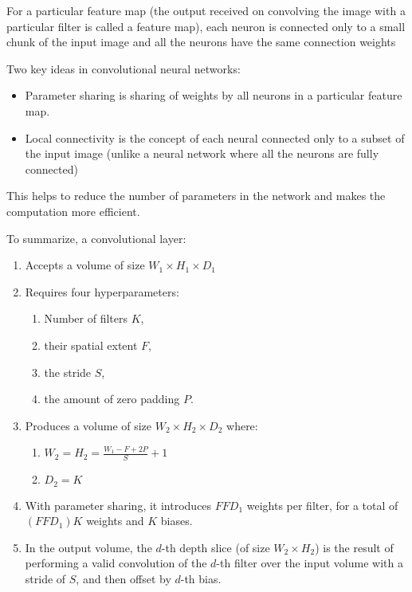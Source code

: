 For a particular feature map (the output received on convolving the image with a particular filter is called a feature map), each neuron is connected only to a small chunk of the input image and all the neurons have the same connection weights

Two key ideas in convolutional neural networks:

\begin{itemize}
    \item Parameter sharing is sharing of weights by all neurons in a particular feature map.
    \item Local connectivity is the concept of each neural connected only to a subset of the input image (unlike a neural network where all the neurons are fully connected)
\end{itemize}

This helps to reduce the number of parameters in the network and makes the computation more efficient.

To summarize, a convolutional layer:

\begin{enumerate}
    \item Accepts a volume of size $W_1 \times H_1 \times D_1$
    \item Requires four hyperparameters:
    \begin{enumerate}
        \item Number of filters $K$,
        \item their spatial extent $F$,
        \item the stride $S$,
        \item the amount of zero padding $P$.
    \end{enumerate}
    \item Produces a volume of size $W_2 \times H_2 \times D_2$ where:
    \begin{enumerate}
        \item $W_2 = H_2 = \frac{W_1 - F + 2P}{S} + 1$
        \item $D_2 = K$
    \end{enumerate}
    \item With parameter sharing, it introduces $F F D_1$ weights per filter, for a total of $(F F D_1) K$ weights and $K$ biases.
    \item In the output volume, the $d$-th depth slice (of size $W_2 \times H_2$) is the result of performing a valid convolution of the $d$-th filter over the input volume with a stride of $S$, and then offset by $d$-th bias.
\end{enumerate}

